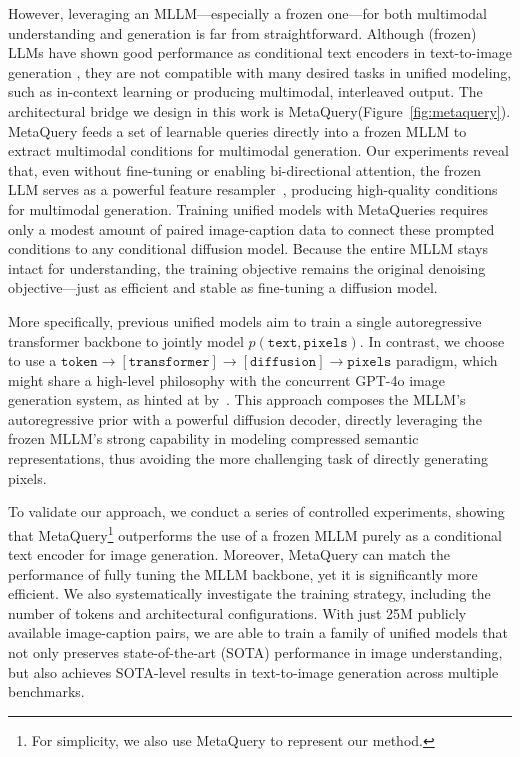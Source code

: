 \documentclass[]{fairmeta}
\newcommand\our{{\fontfamily{lmtt}\selectfont MetaQuery}\xspace}
\newcommand\ours{{\fontfamily{lmtt}\selectfont MetaQueries}\xspace}
\begin{document}
However, leveraging an MLLM---especially a frozen one---for both multimodal understanding and generation is far from straightforward. Although (frozen) LLMs have shown good performance as conditional text encoders in text-to-image generation \citep{luminanext, sana, lidit}, they are not compatible with many desired tasks in unified modeling, such as in-context learning or producing multimodal, interleaved output. The {architectural bridge} we design in this work is \our (Figure~\ref{fig:metaquery}). \our feeds a set of learnable queries directly into a frozen MLLM to extract multimodal conditions for multimodal generation. Our experiments reveal that, even without fine-tuning or enabling bi-directional attention, the frozen LLM serves as a powerful feature resampler~\citep{flamingo}, producing high-quality conditions for multimodal generation. Training unified models with \ours requires only a modest amount of paired image-caption data to connect these prompted conditions to any conditional diffusion model. Because the entire MLLM stays intact for understanding, the training objective remains the original denoising objective---just as efficient and stable as fine-tuning a diffusion model.

More specifically, previous unified models aim to train a single autoregressive transformer backbone to jointly model $p(\texttt{text}, \texttt{pixels})$. In contrast, we choose to use a $\texttt{token} \rightarrow [\texttt{transformer}] \rightarrow [\texttt{diffusion}] \rightarrow \texttt{pixels}$ paradigm, which might share a high-level philosophy with the concurrent GPT-4o image generation system, as hinted at by~\cite{gpt4oimagegeneration}. This approach composes the MLLM's autoregressive prior with a powerful diffusion decoder, directly leveraging the frozen MLLM's strong capability in modeling compressed semantic representations, thus avoiding the more challenging task of directly generating pixels.

To validate our approach, we conduct a series of controlled experiments, showing that \our\footnote{For simplicity, we also use \our to represent our method.} outperforms the use of a frozen MLLM purely as a conditional text encoder for image generation. Moreover, \our can match the performance of fully tuning the MLLM backbone, yet it is significantly more efficient. We also systematically investigate the training strategy, including the number of tokens and architectural configurations. With just 25M publicly available image-caption pairs, we are able to train a family of unified models that not only preserves state-of-the-art (SOTA) performance in image understanding, but also achieves SOTA-level results in text-to-image generation across multiple benchmarks.
\end{document}
